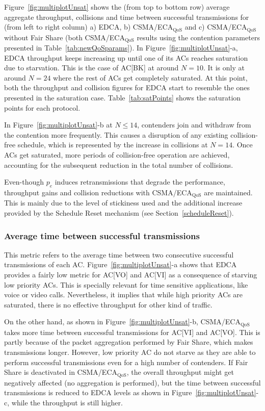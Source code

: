 Figure~\ref{fig:multiplotUnsat} shows the (from top to bottom row) average aggregate throughput, collisions and time between successful transmissions for (from left to right column) a) EDCA, b) CSMA/ECA$_{\text{QoS}}$ and c) CSMA/ECA$_{\text{QoS}}$ without Fair Share (both CSMA/ECA$_{\text{QoS}}$ results using the contention parameters presented in Table~\ref{tab:newQoSparams}). In Figure~\ref{fig:multiplotUnsat}-a, EDCA throughput keeps increasing up until one of its ACs reaches saturation due to starvation. This is the case of AC[BK] at around $N=10$. It is only at around $N=24$ where the rest of ACs get completely saturated. At this point, both the throughput and collision figures for EDCA start to resemble the ones presented in the saturation case. Table~\ref{tab:satPoints} shows the saturation points for each protocol.

In Figure~\ref{fig:multiplotUnsat}-b at $N\leq 14$, contenders join and withdraw from the contention more frequently. This causes a disruption of any existing collision-free schedule, which is represented by the increase in collisions at $N=14$. Once ACs get saturated, more periods of collision-free operation are achieved, accounting for the subsequent reduction in the total number of collisions.

Even-though $p_e$ induces retransmissions that degrade the performance, throughput gains and collision reductions with CSMA/ECA$_{\text{QoS}}$ are maintained. This is mainly due to the level of stickiness used and the additional increase provided by the Schedule Reset mechanism (see Section~\ref{scheduleReset}).

\subsubsection{Average time between successful transmissions}
This metric refers to the average time between two consecutive successful transmissions of each AC. Figure~\ref{fig:multiplotUnsat}-a shows that EDCA provides a fairly low metric for AC[VO] and AC[VI] as a consequence of  starving low priority ACs. This is specially relevant for time sensitive applications, like voice or video calls. Nevertheless, it implies that while high priority ACs are saturated, there is no effective throughput for other kind of traffic.

On the other hand, as shown in Figure~\ref{fig:multiplotUnsat}-b, CSMA/ECA$_{\text{QoS}}$ takes more time between successful transmissions for AC[VI] and AC[VO]. This is partly because of the packet aggregation performed by Fair Share, which makes transmissions longer. However, low priority AC do not starve as they are able to perform successful transmissions even for a high number of contenders. If Fair Share is deactivated in CSMA/ECA$_{\text{QoS}}$, the overall throughput might get negatively affected (no aggregation is performed), but the time between successful transmissions is reduced to EDCA levels as shown in Figure~\ref{fig:multiplotUnsat}-c, while the throughput is still higher.


